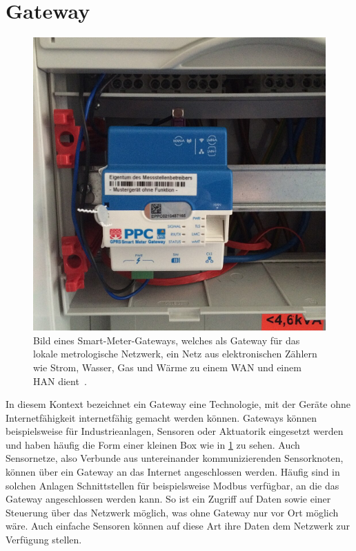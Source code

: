 \section{Gateway}
\begin{figure}[!htb]
	\centering
	\includegraphics[height=0.4\textheight]{images/Gateway.jpg}
	\caption[Bild eines Smart-Meter-Gateways]{
		Bild eines Smart-Meter-Gateways, welches als Gateway für das lokale metrologische Netzwerk, ein Netz aus elektronischen Zählern wie Strom, Wasser, Gas und Wärme zu einem WAN und einem HAN dient~\cite{SmartMeterGateway}.\footnotemark
	}
	\label{pic:gateway}
\end{figure}
In diesem Kontext bezeichnet ein Gateway eine Technologie, mit der Geräte ohne Internetfähigkeit internetfähig gemacht werden können.
Gateways können beispielsweise für Industrieanlagen, Sensoren oder Aktuatorik eingesetzt werden und haben häufig die Form einer kleinen Box wie in \cref{pic:gateway} zu sehen.
Auch Sensornetze, also Verbunde aus untereinander kommunizierenden Sensorknoten, können über ein Gateway an das Internet angeschlossen werden.
Häufig sind in solchen Anlagen Schnittstellen für beispielsweise Modbus verfügbar, an die das Gateway angeschlossen werden kann.
So ist ein Zugriff auf Daten sowie einer Steuerung über das Netzwerk möglich, was ohne Gateway nur vor Ort möglich wäre.
Auch einfache Sensoren können auf diese Art ihre Daten dem Netzwerk zur Verfügung stellen.

